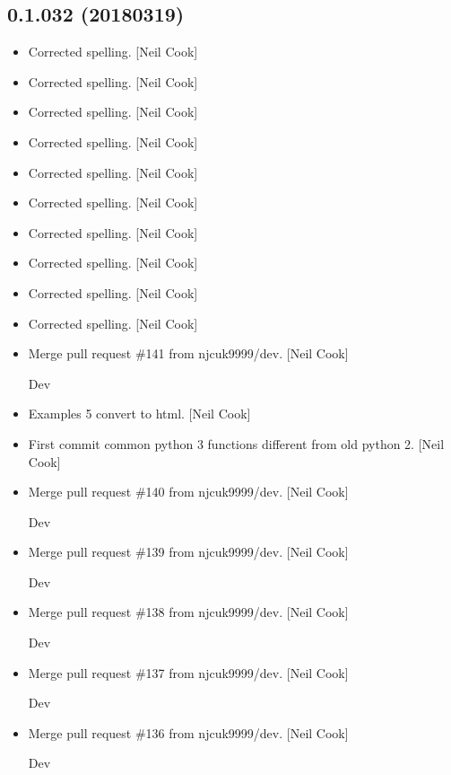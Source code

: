 \documentclass[a4paper,10pt,english]{report}
\begin{document}
\subsection{0.1.032 (2018\sphinxhyphen{}03\sphinxhyphen{}19)}
\label{\detokenize{misc/changelog:id491}}\begin{itemize}
\item {} 
Corrected spelling. {[}Neil Cook{]}

\item {} 
Corrected spelling. {[}Neil Cook{]}

\item {} 
Corrected spelling. {[}Neil Cook{]}

\item {} 
Corrected spelling. {[}Neil Cook{]}

\item {} 
Corrected spelling. {[}Neil Cook{]}

\item {} 
Corrected spelling. {[}Neil Cook{]}

\item {} 
Corrected spelling. {[}Neil Cook{]}

\item {} 
Corrected spelling. {[}Neil Cook{]}

\item {} 
Corrected spelling. {[}Neil Cook{]}

\item {} 
Corrected spelling. {[}Neil Cook{]}

\item {} 
Merge pull request \#141 from njcuk9999/dev. {[}Neil Cook{]}

Dev

\item {} 
Examples 5 convert to html. {[}Neil Cook{]}

\item {} 
First commit \sphinxhyphen{} common python 3 functions different from old python 2.
{[}Neil Cook{]}

\item {} 
Merge pull request \#140 from njcuk9999/dev. {[}Neil Cook{]}

Dev

\item {} 
Merge pull request \#139 from njcuk9999/dev. {[}Neil Cook{]}

Dev

\item {} 
Merge pull request \#138 from njcuk9999/dev. {[}Neil Cook{]}

Dev

\item {} 
Merge pull request \#137 from njcuk9999/dev. {[}Neil Cook{]}

Dev

\item {} 
Merge pull request \#136 from njcuk9999/dev. {[}Neil Cook{]}

Dev

\end{itemize}
\end{document}
